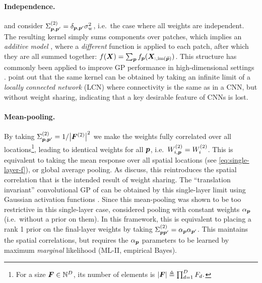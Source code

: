 \documentclass[accepted]{uai2021} %
\newcommand{\layerWs}[1]{W^{(#1)}}
\newcommand{\layersizebase}{\vF}
\newcommand{\layersizebases}{F}
\newcommand{\layersize}[1]{{\layersizebase^{\bra{#1}}}}
\newcommand{\convpatch}[1]{{\text{im}\bra{\tilde#1}}}
\newcommand{\priorWcovs}[1]{\Sigma^{(#1)}}
\newcommand{\chan}{i}
\newcommand{\patch}{\vp}               %
\newcommand{\sigmaw}{{\sigma^{2}_{\text{w}}}}
\newcommand{\0}{\boldsymbol{0}}
\newcommand{\1}{\boldsymbol{1}}
\begin{document}
\paragraph{Independence.}  and \citet{novak2019infiniteconv} consider $\priorWcovs{2}_{\patch,\patch'} = \delta_{\patch,\patch'}\sigmaw$,
i.e.~the case where all weights are independent. The resulting kernel simply sums components over patches, which implies an \emph{additive model} \citep{stone1985}, where a \emph{different} function is applied to each patch, after which they are all summed together: $f(\vX) = \sum_\patch f_\patch(\vX_{:,\convpatch{\patch}})$.
This structure has commonly been applied to improve GP performance in high-dimensional settings \citep[e.g.][]{duvenaud2011additive,durrande2012additive}. \citet{novak2019infiniteconv} point out that the same kernel can be obtained by taking an infinite limit of a \emph{locally connected network} (LCN) \citep{lecun1989generalization} where connectivity is the same as in a CNN, but without weight sharing, indicating that a key desirable feature of CNNs is lost.

\paragraph{Mean-pooling.} By taking $\priorWcovs{2}_{\patch,\patch'} = 1/\abs{\layersize{2}}^{2}$ we make the weights fully correlated over all locations\footnote{For a size $\layersizebase \in \sN^{D}$, its number of elements is $\abs{\layersizebase} \eqdef \prod_{d=1}^{D}\layersizebases_{d}.$}, leading to identical weights for all $\patch$, i.e.~$\layerWs{2}_{\chan,\patch} = \layerWs{2}_{\chan}$. This is equivalent to taking the mean response over all spatial locations (see \cref{eq:single-layer-f}), or global average pooling. As \citet{novak2019infiniteconv} discuss, this reintroduces the spatial correlation that is the intended result of weight sharing. The ``translation invariant'' convolutional GP
of \citet{vdw2017convgp} can be obtained by this single-layer limit using Gaussian activation functions \citep{vdw2019thesis}. Since this mean-pooling was shown to be too restrictive in this single-layer case,  considered pooling with constant weights $\alpha_\patch$ (i.e.~without a prior on them). In this framework, this is equivalent to placing a rank 1 prior on the final-layer weights by taking $\priorWcovs{2}_{\patch\patch'} = \alpha_\patch \alpha_{\patch'}$. This maintains the spatial correlations, but requires the $\alpha_\patch$ parameters to be learned by maximum \textit{marginal} likelihood (ML-II, empirical Bayes).
\end{document}
